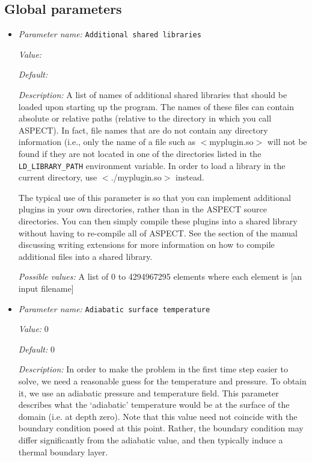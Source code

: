 \subsection{Global parameters}
\label{parameters:global}


\begin{itemize}
\item {\it Parameter name:} {\tt Additional shared libraries}
\label{parameters:Additional shared libraries}


{\it Value:} 


{\it Default:} 


{\it Description:} A list of names of additional shared libraries that should be loaded upon starting up the program. The names of these files can contain absolute or relative paths (relative to the directory in which you call ASPECT). In fact, file names that are do not contain any directory information (i.e., only the name of a file such as $<$myplugin.so$>$ will not be found if they are not located in one of the directories listed in the \texttt{LD\_LIBRARY\_PATH} environment variable. In order to load a library in the current directory, use $<$./myplugin.so$>$ instead.

The typical use of this parameter is so that you can implement additional plugins in your own directories, rather than in the ASPECT source directories. You can then simply compile these plugins into a shared library without having to re-compile all of ASPECT. See the section of the manual discussing writing extensions for more information on how to compile additional files into a shared library.


{\it Possible values:} A list of 0 to 4294967295 elements where each element is [an input filename]
\item {\it Parameter name:} {\tt Adiabatic surface temperature}
\label{parameters:Adiabatic surface temperature}


{\it Value:} 0


{\it Default:} 0


{\it Description:} In order to make the problem in the first time step easier to solve, we need a reasonable guess for the temperature and pressure. To obtain it, we use an adiabatic pressure and temperature field. This parameter describes what the `adiabatic' temperature would be at the surface of the domain (i.e. at depth zero). Note that this value need not coincide with the boundary condition posed at this point. Rather, the boundary condition may differ significantly from the adiabatic value, and then typically induce a thermal boundary layer.


\end{itemize}
